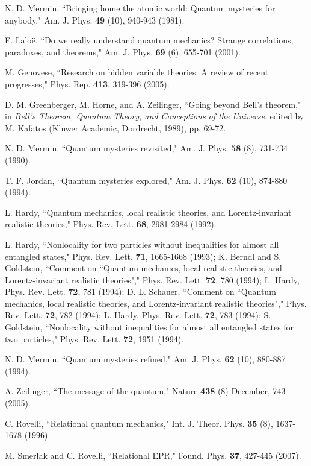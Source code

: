 \documentclass[12pt]{article}
\begin{document}
\begin{thebibliography}{99}
N. D. Mermin,
``Bringing home the atomic world: Quantum mysteries for anybody,"
Am. J. Phys. {\bf 49} (10), 940-943 (1981).

F. Lalo\"e,
``Do we really understand quantum mechanics?
Strange correlations, paradoxes, and theorems,"
Am. J. Phys. {\bf 69} (6), 655-701 (2001).

M. Genovese,
``Research on hidden variable theories: A review of recent progresses,"
Phys. Rep. {\bf 413}, 319-396 (2005).

D. M. Greenberger, M. Horne, and A. Zeilinger,
``Going beyond Bell's theorem,"
in {\it Bell's Theorem, Quantum Theory, and Conceptions 
of the Universe}, edited by M. Kafatos (Kluwer Academic, Dordrecht, 1989),
pp. 69-72. 

N. D. Mermin,
``Quantum mysteries revisited,"
Am. J. Phys. {\bf 58} (8), 731-734 (1990).

T. F. Jordan,
``Quantum mysteries explored,"
Am. J. Phys. {\bf 62} (10), 874-880 (1994).

L. Hardy,
``Quantum mechanics, local realistic theories, and 
Lorentz-invariant realistic theories,"
Phys. Rev. Lett. {\bf 68}, 2981-2984 (1992). 

%
L. Hardy,
``Nonlocality for two particles without inequalities for almost all
entangled states,"
Phys. Rev. Lett. {\bf 71}, 1665-1668 (1993);
%
K. Berndl and S. Goldstein, 
``Comment on ``Quantum mechanics, local realistic theories, and 
Lorentz-invariant realistic theories","
Phys. Rev. Lett. {\bf 72}, 780 (1994);
L. Hardy,
Phys. Rev. Lett. {\bf 72}, 781 (1994); 
%
D. L. Schauer,
``Comment on ``Quantum mechanics, local realistic theories, and
Lorentz-invariant realistic theories","
Phys. Rev. Lett. {\bf 72}, 782 (1994);
L. Hardy,
Phys. Rev. Lett. {\bf 72}, 783 (1994);
%
S. Goldstein,
``Nonlocality without inequalities for almost all entangled states 
for two particles,"
Phys. Rev. Lett. {\bf 72}, 1951 (1994).

N. D. Mermin, 
``Quantum mysteries refined,"
Am. J. Phys. {\bf 62} (10), 880-887 (1994).

A. Zeilinger,
``The message of the quantum,"
Nature {\bf 438} (8) December, 743 (2005).

C. Rovelli,
``Relational quantum mechanics,"
Int. J. Theor. Phys. {\bf 35} (8), 1637-1678 (1996).

M. Smerlak and C. Rovelli,
``Relational EPR,"
Found. Phys. {\bf 37}, 427-445 (2007).


\end{thebibliography}
\end{document}
